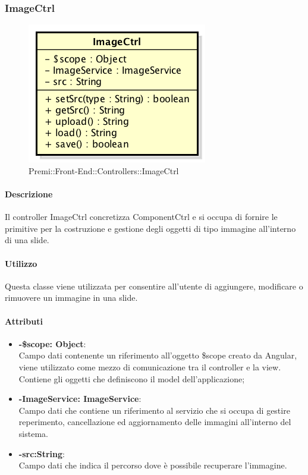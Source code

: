 \newpage
\subsubsection{ImageCtrl}
\begin{figure}[h]
	\centering
	\includegraphics[width=0.4\linewidth]{img/premi_front_end_controllers_imagectrl}
	\caption[Premi::Front-End::Controllers::ImageCtrl]{Premi::Front-End::Controllers::ImageCtrl}
\end{figure}
   \paragraph{Descrizione}
	Il controller ImageCtrl concretizza ComponentCtrl e si occupa di fornire le primitive per la costruzione e gestione degli oggetti di tipo immagine all'interno di una slide.
		
	\paragraph{Utilizzo}
	Questa classe viene utilizzata per consentire all'utente di aggiungere, modificare o rimuovere un immagine in una slide.
	
	\paragraph{Attributi}
	\begin{itemize}
		\item \textbf{-\$scope: Object}:\\
			Campo dati contenente un riferimento all'oggetto \$scope creato da Angular, viene utilizzato come mezzo di comunicazione tra il controller e la view. Contiene gli oggetti che definiscono il model dell'applicazione;
		\item \textbf{-ImageService: ImageService}:\\
			Campo dati che contiene un riferimento al servizio che si occupa di gestire reperimento, cancellazione ed aggiornamento delle immagini all'interno del sistema.
		\item\textbf{-src:String}:\\
			Campo dati che indica il percorso dove è possibile recuperare l'immagine.
	\end{itemize}
	
